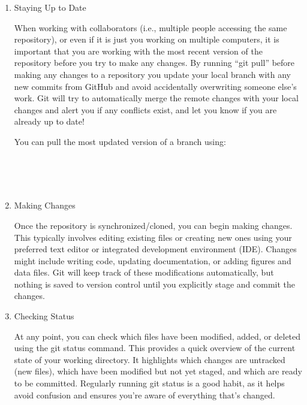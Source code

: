 \begin{enumerate}
\item Staying Up to Date

When working with collaborators (i.e., multiple people accessing the same repository), or even if it is just you working on multiple computers, it is important that you are working with the most recent version of the repository before you try to make any changes. By running ``git pull'' before making any changes to a repository you update your local branch with any new commits from GitHub and avoid accidentally overwriting someone else’s work. Git will try to automatically merge the remote changes with your local changes and alert you if any conflicts exist, and let you know if you are already up to date!

You can pull the most updated version of a branch using:
\begin{terminal}
\\
\\
\\
\end{terminal}

\item Making Changes

Once the repository is synchronized/cloned, you can begin making changes. This typically involves editing existing files or creating new ones using your preferred text editor or integrated development environment (IDE). Changes might include writing code, updating documentation, or adding figures and data files. Git will keep track of these modifications automatically, but nothing is saved to version control until you explicitly stage and commit the changes.

\item Checking Status

At any point, you can check which files have been modified, added, or deleted using the git status command. This provides a quick overview of the current state of your working directory. It highlights which changes are untracked (new files), which have been modified but not yet staged, and which are ready to be committed. Regularly running git status is a good habit, as it helps avoid confusion and ensures you’re aware of everything that’s changed.
\begin{terminal}
\end{terminal}


\end{enumerate}
